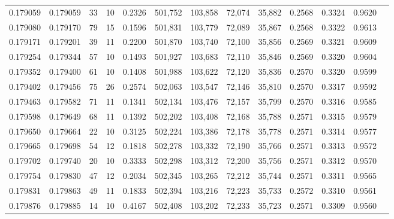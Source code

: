 \begin{tabular}{rrrrrrrrrrrrr}
0.179059 & 0.179059 &    33 &  10 &                                     0.2326 & 501,752 & 103,858 &  72,074 &  35,882 & 0.2568 & 0.3324 & 0.9620 \\
0.179080 & 0.179170 &    79 &  15 &                                     0.1596 & 501,831 & 103,779 &  72,089 &  35,867 & 0.2568 & 0.3322 & 0.9613 \\
0.179171 & 0.179201 &    39 &  11 &                                     0.2200 & 501,870 & 103,740 &  72,100 &  35,856 & 0.2569 & 0.3321 & 0.9609 \\
0.179254 & 0.179344 &    57 &  10 &                                     0.1493 & 501,927 & 103,683 &  72,110 &  35,846 & 0.2569 & 0.3320 & 0.9604 \\
0.179352 & 0.179400 &    61 &  10 &                                     0.1408 & 501,988 & 103,622 &  72,120 &  35,836 & 0.2570 & 0.3320 & 0.9599 \\
0.179402 & 0.179456 &    75 &  26 &                                     0.2574 & 502,063 & 103,547 &  72,146 &  35,810 & 0.2570 & 0.3317 & 0.9592 \\
0.179463 & 0.179582 &    71 &  11 &                                     0.1341 & 502,134 & 103,476 &  72,157 &  35,799 & 0.2570 & 0.3316 & 0.9585 \\
0.179598 & 0.179649 &    68 &  11 &                                     0.1392 & 502,202 & 103,408 &  72,168 &  35,788 & 0.2571 & 0.3315 & 0.9579 \\
0.179650 & 0.179664 &    22 &  10 &                                     0.3125 & 502,224 & 103,386 &  72,178 &  35,778 & 0.2571 & 0.3314 & 0.9577 \\
0.179665 & 0.179698 &    54 &  12 &                                     0.1818 & 502,278 & 103,332 &  72,190 &  35,766 & 0.2571 & 0.3313 & 0.9572 \\
0.179702 & 0.179740 &    20 &  10 &                                     0.3333 & 502,298 & 103,312 &  72,200 &  35,756 & 0.2571 & 0.3312 & 0.9570 \\
0.179754 & 0.179830 &    47 &  12 &                                     0.2034 & 502,345 & 103,265 &  72,212 &  35,744 & 0.2571 & 0.3311 & 0.9565 \\
0.179831 & 0.179863 &    49 &  11 &                                     0.1833 & 502,394 & 103,216 &  72,223 &  35,733 & 0.2572 & 0.3310 & 0.9561 \\
0.179876 & 0.179885 &    14 &  10 &                                     0.4167 & 502,408 & 103,202 &  72,233 &  35,723 & 0.2571 & 0.3309 & 0.9560 \\

\end{tabular}
